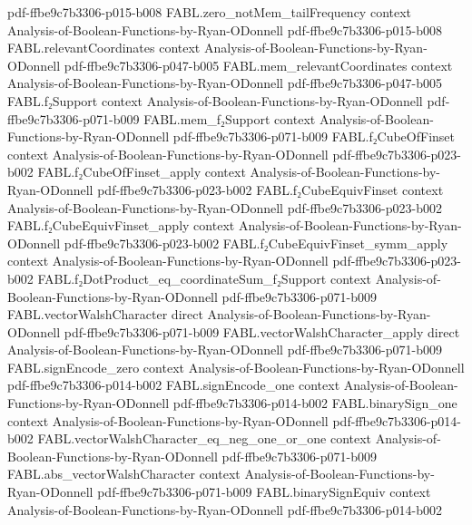 \begin{theorem}
  {pdf-ffbe9c7b3306-p015-b008}
\proofstep
  {FABL.zero_notMem_tailFrequency}
  {context}
  {Analysis-of-Boolean-Functions-by-Ryan-ODonnell}
  {pdf-ffbe9c7b3306-p015-b008}
\proofstep
  {FABL.relevantCoordinates}
  {context}
  {Analysis-of-Boolean-Functions-by-Ryan-ODonnell}
  {pdf-ffbe9c7b3306-p047-b005}
\proofstep
  {FABL.mem_relevantCoordinates}
  {context}
  {Analysis-of-Boolean-Functions-by-Ryan-ODonnell}
  {pdf-ffbe9c7b3306-p047-b005}
\proofstep
  {FABL.f₂Support}
  {context}
  {Analysis-of-Boolean-Functions-by-Ryan-ODonnell}
  {pdf-ffbe9c7b3306-p071-b009}
\proofstep
  {FABL.mem_f₂Support}
  {context}
  {Analysis-of-Boolean-Functions-by-Ryan-ODonnell}
  {pdf-ffbe9c7b3306-p071-b009}
\proofstep
  {FABL.f₂CubeOfFinset}
  {context}
  {Analysis-of-Boolean-Functions-by-Ryan-ODonnell}
  {pdf-ffbe9c7b3306-p023-b002}
\proofstep
  {FABL.f₂CubeOfFinset_apply}
  {context}
  {Analysis-of-Boolean-Functions-by-Ryan-ODonnell}
  {pdf-ffbe9c7b3306-p023-b002}
\proofstep
  {FABL.f₂CubeEquivFinset}
  {context}
  {Analysis-of-Boolean-Functions-by-Ryan-ODonnell}
  {pdf-ffbe9c7b3306-p023-b002}
\proofstep
  {FABL.f₂CubeEquivFinset_apply}
  {context}
  {Analysis-of-Boolean-Functions-by-Ryan-ODonnell}
  {pdf-ffbe9c7b3306-p023-b002}
\proofstep
  {FABL.f₂CubeEquivFinset_symm_apply}
  {context}
  {Analysis-of-Boolean-Functions-by-Ryan-ODonnell}
  {pdf-ffbe9c7b3306-p023-b002}
\proofstep
  {FABL.f₂DotProduct_eq_coordinateSum_f₂Support}
  {context}
  {Analysis-of-Boolean-Functions-by-Ryan-ODonnell}
  {pdf-ffbe9c7b3306-p071-b009}
\proofstep
  {FABL.vectorWalshCharacter}
  {direct}
  {Analysis-of-Boolean-Functions-by-Ryan-ODonnell}
  {pdf-ffbe9c7b3306-p071-b009}
\proofstep
  {FABL.vectorWalshCharacter_apply}
  {direct}
  {Analysis-of-Boolean-Functions-by-Ryan-ODonnell}
  {pdf-ffbe9c7b3306-p071-b009}
\proofstep
  {FABL.signEncode_zero}
  {context}
  {Analysis-of-Boolean-Functions-by-Ryan-ODonnell}
  {pdf-ffbe9c7b3306-p014-b002}
\proofstep
  {FABL.signEncode_one}
  {context}
  {Analysis-of-Boolean-Functions-by-Ryan-ODonnell}
  {pdf-ffbe9c7b3306-p014-b002}
\proofstep
  {FABL.binarySign_one}
  {context}
  {Analysis-of-Boolean-Functions-by-Ryan-ODonnell}
  {pdf-ffbe9c7b3306-p014-b002}
\proofstep
  {FABL.vectorWalshCharacter_eq_neg_one_or_one}
  {context}
  {Analysis-of-Boolean-Functions-by-Ryan-ODonnell}
  {pdf-ffbe9c7b3306-p071-b009}
\proofstep
  {FABL.abs_vectorWalshCharacter}
  {context}
  {Analysis-of-Boolean-Functions-by-Ryan-ODonnell}
  {pdf-ffbe9c7b3306-p071-b009}
\proofstep
  {FABL.binarySignEquiv}
  {context}
  {Analysis-of-Boolean-Functions-by-Ryan-ODonnell}
  {pdf-ffbe9c7b3306-p014-b002}

\end{theorem}
